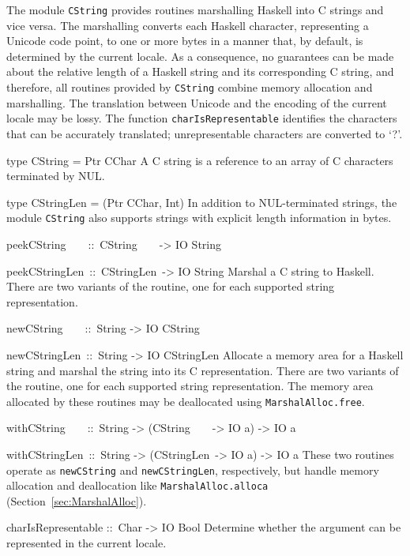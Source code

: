 \documentclass[a4paper,twoside]{article}
\makeatletter
\newcommand{\code}[1]{\texttt{#1}}      %
\newenvironment{codedesc}{%
  \list{}{\labelwidth\z@
    \let\makelabel\codedesclabel}
  }{%
  \endlist
  }
\newcommand*{\codedesclabel}[1]{%
  \hspace{-\leftmargin}
  \parbox[b]{\labelwidth}{\makebox[0pt][l]{\code{#1}}\\}\hfil\relax
  }
\newcommand{\combineitems}{\vspace*{-\itemsep}\vspace*{-\parsep}\vspace*{-1em}}
\makeatother
\begin{document}
The module \code{CString} provides routines marshalling Haskell into C strings
and vice versa.  The marshalling converts each Haskell character, representing
a Unicode code point, to one or more bytes in a manner that, by default, is
determined by the current locale.  As a consequence, no guarantees can be made
about the relative length of a Haskell string and its corresponding C string,
and therefore, all routines provided by \code{CString} combine memory
allocation and marshalling.  The translation between Unicode and the encoding
of the current locale may be lossy.  The function \code{charIsRepresentable}
identifies the characters that can be accurately translated; unrepresentable
characters are converted to `?'.
%
\begin{codedesc}
\item[type CString = Ptr CChar] A C string is a reference to an array of C
  characters terminated by NUL.
  
\item[type CStringLen = (Ptr CChar, Int)] In addition to NUL-terminated
  strings, the module \code{CString} also supports strings with explicit
  length information in bytes.

\item[peekCString~~~~::\ CString~~~~-> IO String]
\item[peekCStringLen~::\ CStringLen~-> IO String]\combineitems
  Marshal a C string to Haskell.  There are two variants of the routine, one
  for each supported string representation.

\item[newCString~~~~::\ String -> IO CString]
\item[newCStringLen~::\ String -> IO CStringLen] \combineitems Allocate a
  memory area for a Haskell string and marshal the string into its C
  representation.  There are two variants of the routine, one for each
  supported string representation.  The memory area allocated by these
  routines may be deallocated using \code{MarshalAlloc.free}.

\item[withCString~~~~::\ String -> (CString~~~~-> IO a) -> IO a]
\item[withCStringLen~::\ String -> (CStringLen~-> IO a) -> IO a] \combineitems
  These two routines operate as \code{newCString} and \code{newCStringLen},
  respectively, but handle memory allocation and deallocation like
  \code{MarshalAlloc.alloca} (Section~\ref{sec:MarshalAlloc}).
  
\item[charIsRepresentable ::\ Char -> IO Bool] Determine whether the argument
  can be represented in the current locale.

\end{codedesc}
\end{document}
